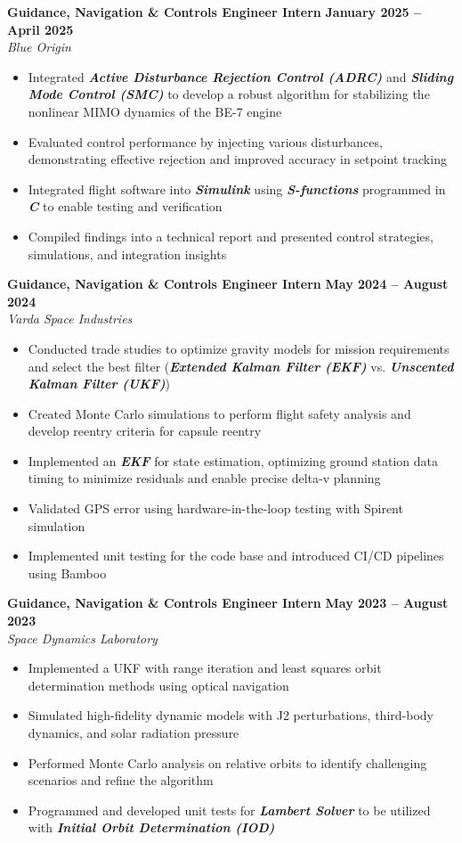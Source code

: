 \documentclass[10pt]{article}
\begin{document}
	\textbf{Guidance, Navigation \& Controls Engineer Intern} \hfill \textbf{January 2025 – April 2025} \\
	\emph{Blue Origin}
	\begin{itemize}
	    \item Integrated \textbf{\emph{Active Disturbance Rejection Control (ADRC)}} and \textbf{\emph{Sliding Mode Control (SMC)}} to develop a robust algorithm for stabilizing the nonlinear MIMO dynamics of the BE-7 engine
	    \item Evaluated control performance by injecting various disturbances, demonstrating effective rejection and improved accuracy in setpoint tracking
	   \item Integrated flight software into \textbf{\emph{Simulink}} using \textbf{\emph{S-functions}} programmed in \textbf{\emph{C}} to enable testing and verification
	    \item Compiled findings into a technical report and presented control strategies, simulations, and integration insights
	\end{itemize}

	\textbf{Guidance, Navigation \& Controls Engineer Intern} \hfill \textbf{May 2024 – August 2024} \\
	\emph{Varda Space Industries}
	\begin{itemize}
	    \item Conducted trade studies to optimize gravity models for mission requirements and select the best filter (\textbf{\emph{Extended Kalman Filter (EKF)}} vs. \textbf{\emph{Unscented Kalman Filter (UKF)}})
	    \item Created Monte Carlo simulations to perform flight safety analysis and develop reentry criteria for capsule reentry
	    \item Implemented an \textbf{\emph{EKF}} for state estimation, optimizing ground station data timing to minimize residuals and enable precise delta-v planning
	    \item Validated GPS error using hardware-in-the-loop testing with Spirent simulation
	    \item Implemented unit testing for the code base and introduced CI/CD pipelines using Bamboo
	\end{itemize}

	\textbf{Guidance, Navigation \& Controls Engineer Intern} \hfill \textbf{May 2023 – August 2023} \\
	\emph{Space Dynamics Laboratory}
	\begin{itemize}
	    \item Implemented a UKF with range iteration and least squares orbit determination methods using optical navigation
	    \item Simulated high-fidelity dynamic models with J2 perturbations, third-body dynamics, and solar radiation pressure
	    \item Performed Monte Carlo analysis on relative orbits to identify challenging scenarios and refine the algorithm
	    \item Programmed and developed unit tests for \textbf{\emph{Lambert Solver}} to be utilized with \textbf{\emph{Initial Orbit Determination (IOD)}}
	\end{itemize}
	
\end{document}
